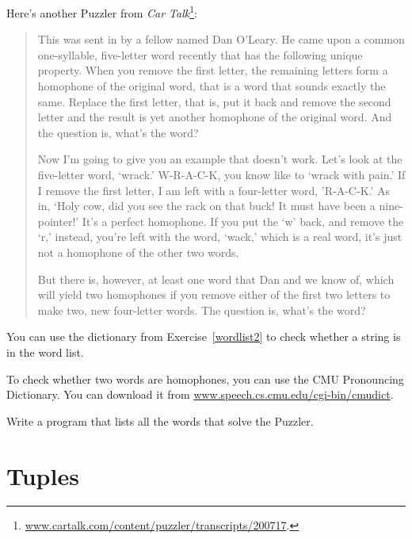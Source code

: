 \documentclass[10pt]{book}
\begin{document}
\begin{ex}

Here's another Puzzler from {\em Car
Talk}\footnote{\url{www.cartalk.com/content/puzzler/transcripts/200717}.}:

\begin{quote}
This was sent in by a fellow named Dan O'Leary. He came upon a common
one-syllable, five-letter word recently that has the following unique
property. When you remove the first letter, the remaining letters form
a homophone of the original word, that is a word that sounds exactly
the same. Replace the first letter, that is, put it back and remove
the second letter and the result is yet another homophone of the
original word. And the question is, what's the word?

Now I'm going to give you an example that doesn't work. Let's look at
the five-letter word, `wrack.' W-R-A-C-K, you know like to `wrack with
pain.' If I remove the first letter, I am left with a four-letter
word, 'R-A-C-K.' As in, `Holy cow, did you see the rack on that buck!
It must have been a nine-pointer!' It's a perfect homophone. If you
put the `w' back, and remove the `r,' instead, you're left with the
word, `wack,' which is a real word, it's just not a homophone of the
other two words.

But there is, however, at least one word that Dan and we know of,
which will yield two homophones if you remove either of the first two
letters to make two, new four-letter words. The question is, what's
the word?
\end{quote}


You can use the dictionary from Exercise~\ref{wordlist2} to check
whether a string is in the word list.

To check whether two words are homophones, you can use the CMU
Pronouncing Dictionary.  You can download it from
\url{www.speech.cs.cmu.edu/cgi-bin/cmudict}.

Write a program that lists all the words that solve the Puzzler.

\end{ex}



\chapter{Tuples}
\label{tuplechap}
\end{document}
